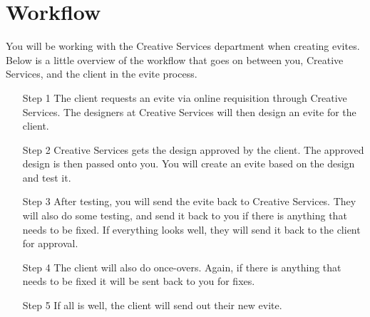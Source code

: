 \documentclass[a4paper,11pt]{article}
\begin{document}
	\section{Workflow}
	You will be working with the Creative Services department when creating evites. Below is a little overview of the workflow that goes on between you, Creative Services, and the client in the evite process.
	\begin{itemize}
		\item[Step 1] The client requests an evite via online requisition through Creative Services. The designers at Creative Services will then design an evite for the client.
		\item[Step 2] Creative Services gets the design approved by the client. The approved design is then passed onto you. You will create an evite based on the design and test it.
		\item[Step 3] After testing, you will send the evite back to Creative Services. They will also do some testing, and send it back to you if there is anything that needs to be fixed. If everything looks well, they will send it back to the client for approval.
		\item[Step 4] The client will also do once-overs. Again, if there is anything that needs to be fixed it will be sent back to you for fixes.
		\item[Step 5] If all is well, the client will send out their new evite.
	\end{itemize}
	
\end{document}
